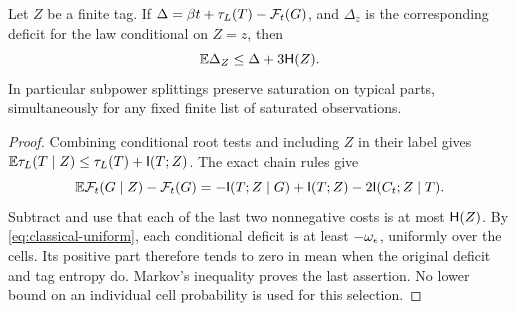 \begin{lemma}
\label{lem:classical-splitting}
Let $Z$ be a finite tag.  If $\Delta=\beta t+\tau_L(T)-\mathcal F_t(G)$,
and $\Delta_z$ is the corresponding deficit for the law conditional on
$Z=z$, then
\[
 \mathbb E\Delta_Z\le\Delta+3\mathsf H(Z).
\]
In particular subpower splittings preserve saturation on typical parts,
simultaneously for any fixed finite list of saturated observations.
\end{lemma}
\begin{proof}
Combining conditional root tests and including $Z$ in their label gives
$\mathbb E\tau_L(T\mid Z)\le\tau_L(T)+\mathsf I(T;Z)$.
The exact chain rules give
\[
 \mathbb E\mathcal F_t(G\mid Z)-\mathcal F_t(G)
 =-\mathsf I(T;Z\mid G)+\mathsf I(T;Z)-2\mathsf I(C_t;Z\mid T).
\]
Subtract and use that each of the last two nonnegative costs is at most
$\mathsf H(Z)$.  By \eqref{eq:classical-uniform}, each conditional deficit is
at least $-\omega_\epsilon$, uniformly over the cells.  Its positive part
therefore tends to zero in mean when the original deficit and tag
entropy do.  Markov's inequality proves the last assertion.  No lower
bound on an individual cell probability is used for this selection.
\end{proof}

